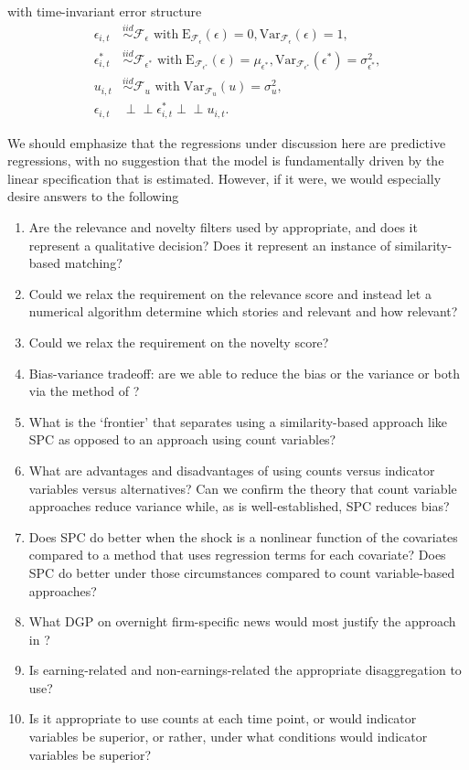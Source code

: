 \documentclass{uiucthesis2021}
\newcommand{\simiid}{\stackrel{iid}{\sim}} %
\newcommand{\indep}{\perp \!\!\! \perp } %
\def\mrm#1{\mathrm{#1}} %
\def\mc#1{\mathcal{#1}} %
\def\mc#1{\mathcal{#1}}
\theoremstyle{definition}
\begin{document}
    with time-invariant error structure
    \begin{align*}
      \epsilon_{i,t} &\simiid \mc{F}_{\epsilon} \text{ with}  \; \mrm{E}_{\mc{F}_{\epsilon}}(\epsilon) = 0, \mrm{Var}_{\mc{F}_{\epsilon}}(\epsilon)  = 1,  \\
      \epsilon^{*}_{i,t} &\simiid \mc{F}_{\epsilon^{*}} \text{ with}  \; \mrm{E}_{\mc{F}_{\epsilon^{*}}}(\epsilon) = \mu_{\epsilon^{*}}, \mrm{Var}_{\mc{F}_{\epsilon^{*}}}(\epsilon^{*})  = \sigma^2_{\epsilon^{*}},  \\
      u_{i,t} & \simiid  \mc{F}_{u} \text{ with}  \; \mrm{Var}_{\mc{F}_{u}}(u) = \sigma^2_{u},\\
      \epsilon_{i,t} & \indep  \epsilon^{*}_{i,t}  \indep u_{i,t}.
      \end{align*}
  
  We should emphasize that the regressions under discussion here are predictive regressions, with no suggestion that the model is fundamentally driven by the linear specification that is estimated.  However, if it were, we would especially desire answers to the following
  
  \begin{enumerate}
    \item Are the relevance and novelty filters used by \cite[][]{bodilsen2023exploiting} appropriate, and does it represent a qualitative decision?  Does it represent an instance of similarity-based matching?
    \item Could we relax the requirement on the relevance score and instead let a numerical algorithm determine which stories and relevant and how relevant?
    \item Could we relax the requirement on the novelty score?
    \item Bias-variance tradeoff: are we able to reduce the bias or the variance or both via the method of \cite[][]{bodilsen2023exploiting}?
    \item What is the `frontier' that separates using a similarity-based approach like SPC as opposed to an approach using count variables?
    \item What are advantages and disadvantages of using counts versus indicator variables versus alternatives?  Can we confirm the theory that count variable approaches reduce variance while, as is well-established, SPC reduces bias?
    \item Does SPC do better when the shock is a nonlinear function of the covariates compared to a method that uses regression terms for each covariate?  Does SPC do better under those circumstances compared to count variable-based approaches? 
    \item  What DGP on overnight firm-specific news would most justify the approach in \cite[][]{bodilsen2023exploiting}?
    \item Is earning-related and non-earnings-related the appropriate disaggregation to use?
    \item Is it appropriate to use counts at each time point, or would indicator variables be superior, or rather, under what conditions would indicator variables be superior?
  
  \end{enumerate}
  
\end{document}
